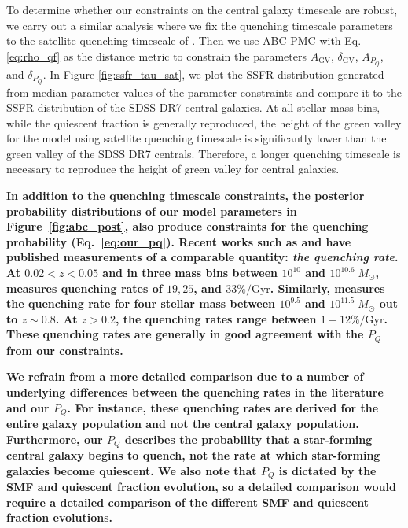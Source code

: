 \documentclass[iop,apj,tighten,twocolappendix,numberedappendix]{emulateapj}
\begin{document}
To determine whether our constraints on the central galaxy 
timescale are robust, we carry out a similar analysis where
we fix the quenching timescale parameters to the satellite quenching 
timescale of \cite{Wetzel:2013aa}. Then we use ABC-PMC with 
Eq. \ref{eq:rho_qf} as the distance metric to constrain the 
parameters $A_\mathrm{GV}$, $\delta_\mathrm{GV}$, $A_{P_Q}$, 
and $\delta_{P_Q}$. In Figure \ref{fig:ssfr_tau_sat}, we plot 
the SSFR distribution generated from median parameter values 
of the parameter constraints and compare it to the SSFR 
distribution of the SDSS DR7 central galaxies. At all stellar 
mass bins, while the quiescent fraction is generally reproduced, 
the height of the green valley for the model using satellite 
quenching timescale is significantly lower than the green valley 
of the SDSS DR7 centrals. 
Therefore, a longer quenching timescale is necessary to 
reproduce the height of green valley for central galaxies.

{\bf \color{dred}
In addition to the quenching timescale constraints, the posterior 
probability distributions of our model parameters in Figure~\ref{fig:abc_post}, 
also produce constraints for the quenching probability (Eq.~\ref{eq:our_pq}). 
Recent works such as \cite{Moustakas:2013aa} and \cite{Lian:2016aa} 
have published measurements of a comparable quantity: {\em the 
quenching rate}. At $0.02 < z < 0.05$ and in three mass bins between 
$10^{10}$ and $10^{10.6}\; M_\odot$, \cite{Lian:2016aa} measures 
quenching rates of $19, 25$, and $33\%/\mathrm{Gyr}$. Similarly, 
\cite{Moustakas:2013aa} measures the quenching rate for 
four stellar mass between $10^{9.5}$ and $10^{11.5}\; M_\odot$ out 
to $z\sim0.8$. At $z > 0.2$, the \cite{Moustakas:2013aa} quenching 
rates range between $1 - 12\%/\mathrm{Gyr}$. These quenching
rates are generally in good agreement with the $P_{Q}$ from our 
constraints.
}

{\bf \color{dred}
We refrain from a more detailed comparison due to 
a number of underlying differences between the quenching rates in 
the literature and our $P_Q$. For instance, these quenching rates 
are derived for the entire galaxy population and not the 
central galaxy population. Furthermore, our $P_Q$ describes the 
probability that a star-forming central galaxy begins to quench, 
not the rate at which star-forming galaxies become quiescent. 
We also note that $P_{Q}$ is dictated by the SMF and quiescent
fraction evolution, so a detailed comparison would require a detailed
comparison of the different SMF and quiescent fraction evolutions. 
}
\end{document}
